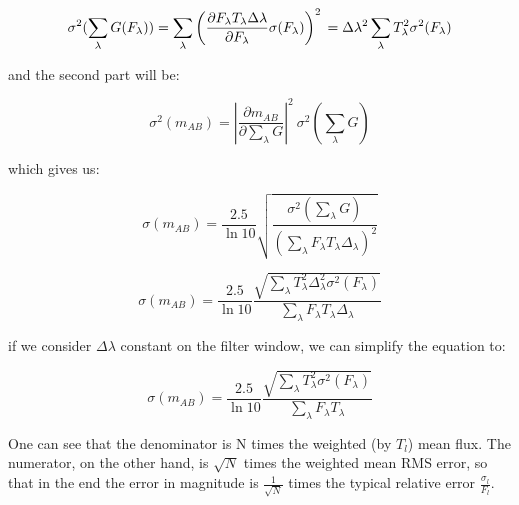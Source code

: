 \documentclass[11pt]{article}
\begin{document}
\begin{equation}
\sigma^2(\sum_\lambda G(F_\lambda))
= \sum_\lambda \left( \frac{\partial F_\lambda T_\lambda \Delta\lambda}{\partial F_\lambda} \sigma(F_\lambda) \right)^2 \\
= \Delta\lambda^2 \sum_\lambda T^2_\lambda \sigma^2(F_\lambda)
\end{equation}

\newpage{}

and the second part will be:

\begin{equation}
\sigma^2(m_{AB}) = \left|\frac{\partial m_{AB}}{\partial \sum_\lambda G}\right|^2\ \sigma^2 \left(\sum_\lambda G \right)
\end{equation}

which gives us:

\begin{equation}
\sigma(m_{AB}) = \frac{2.5}{\ln 10} \sqrt{\frac{ \sigma^2(\sum_\lambda G) }{\left(\sum_\lambda F_\lambda T_\lambda \Delta_\lambda\right)^2}}
\end{equation}

\begin{equation}
\sigma(m_{AB}) = \frac{2.5}{\ln 10} \frac{\sqrt{\sum_\lambda T^2_\lambda \Delta^2_\lambda \sigma^2(F_\lambda)}}
				                         {\sum_\lambda F_\lambda T_\lambda \Delta_\lambda}
\end{equation}

if we consider $\Delta \lambda$ constant on the filter window, we can simplify the equation to:

\begin{equation}
\sigma(m_{AB}) = \frac{2.5}{\ln 10} \frac{\sqrt{\sum_\lambda T^2_\lambda\sigma^2(F_\lambda)}}
											{   {\sum_\lambda F_\lambda T_\lambda} }
\end{equation}

One can see that the denominator is N times the weighted (by $T_l$) mean flux.
The numerator, on the other hand, is $\sqrt{N}$ times the weighted mean RMS
error, so that in the end the error in magnitude is $\frac{1}{\sqrt{N}}$ times
the typical relative error $\frac{\sigma_l}{F_l}$.
\end{document}

